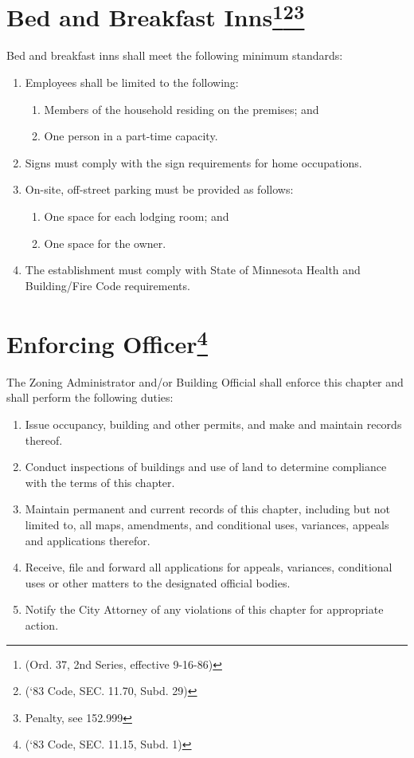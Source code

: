 \section{Bed and Breakfast Inns\footnote{(Ord. 37, 2nd Series, effective 9-16-86)}\footnote{(‘83 Code, SEC. 11.70, Subd. 29)}\footnote{Penalty, see 152.999}}
Bed and breakfast inns shall meet the following minimum standards:
\begin{enumerate}[{\indent}A)]
    \item Employees shall be limited to the following:
        \begin{enumerate}
            \item Members of the household residing on the premises; and 
            \item One person in a part-time capacity.
        \end{enumerate}
    \item Signs must comply with the sign requirements for home occupations.
    \item On-site, off-street parking must be provided as follows: 
        \begin{enumerate}
            \item One space for each lodging room; and 
            \item One space for the owner.
        \end{enumerate}
    \item The establishment must comply with State of Minnesota Health and Building/Fire Code requirements.
\end{enumerate}


\setcounter{section}{194}
\section{Enforcing Officer\footnote{(‘83 Code, SEC. 11.15, Subd. 1)}}
The Zoning Administrator and/or Building Official shall enforce this chapter and shall perform the following duties:
\begin{enumerate}[{\indent}A)]
    \item Issue occupancy, building and other permits, and make and maintain records thereof.
    \item Conduct inspections of buildings and use of land to determine compliance with the terms of this chapter.
    \item Maintain permanent and current records of this chapter, including but not limited to, all maps, amendments, and conditional uses, variances, appeals and applications therefor.
    \item Receive, file and forward all applications for appeals, variances, conditional uses or other matters to the designated official bodies.
    \item Notify the City Attorney of any violations of this chapter for appropriate action.
\end{enumerate}


